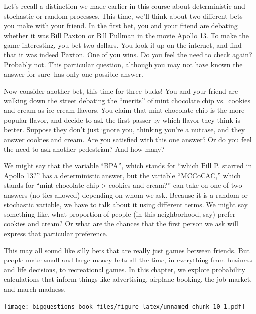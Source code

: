 \documentclass[]{book}
\begin{document}
Let's recall a distinction we made earlier in this course about deterministic and stochastic or random processes. This time, we'll think about two different bets you make with your friend. In the first bet, you and your friend are debating whether it was Bill Paxton or Bill Pullman in the movie Apollo 13. To make the game interesting, you bet two dollars. You look it up on the internet, and find that it was indeed Paxton. One of you wins. Do you feel the need to check again? Probably not. This particular question, although you may not have known the answer for sure, has only one possible answer.

Now consider another bet, this time for three bucks! You and your friend are walking down the street debating the ``merits'' of mint chocolate chip vs.~cookies and cream as ice cream flavors. You claim that mint chocolate chip is the more popular flavor, and decide to ask the first passer-by which flavor they think is better. Suppose they don't just ignore you, thinking you're a nutcase, and they answer cookies and cream. Are you satisfied with this one answer? Or do you feel the need to ask another pedestrian? And how many?

We might say that the variable ``BPA'', which stands for ``which Bill P. starred in Apollo 13?'' has a deterministic answer, but the variable ``MCCoCAC,'' which stands for ``mint chocolate chip \textgreater{} cookies and cream?'' can take on one of two answers (no ties allowed) depending on whom we ask. Because it is a random or stochastic variable, we have to talk about it using different terms. We might say something like, what proportion of people (in this neighborhood, say) prefer cookies and cream? Or what are the chances that the first person we ask will express that particular preference.

This may all sound like silly bets that are really just games between friends. But people make small and large money bets all the time, in everything from business and life decisions, to recreational games. In this chapter, we explore probability calculations that inform things like advertising, airplane booking, the job market, and march madness.

\texttt{[image: bigquestions-book\_files/figure-latex/unnamed-chunk-10-1.pdf]}
\end{document}
